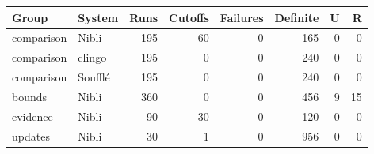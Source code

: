 \begin{tabular}{llrrrrrr}
\toprule
Group & System & Runs & Cutoffs & Failures & Definite & U & R \\
\midrule
comparison & Nibli & 195 & 60 & 0 & 165 & 0 & 0 \\
comparison & clingo & 195 & 0 & 0 & 240 & 0 & 0 \\
comparison & Souffl\'e & 195 & 0 & 0 & 240 & 0 & 0 \\
bounds & Nibli & 360 & 0 & 0 & 456 & 9 & 15 \\
evidence & Nibli & 90 & 30 & 0 & 120 & 0 & 0 \\
updates & Nibli & 30 & 1 & 0 & 956 & 0 & 0 \\
\bottomrule
\end{tabular}
